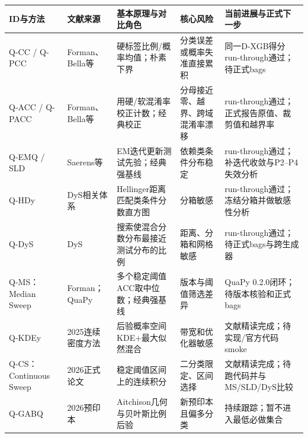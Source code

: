 \documentclass[
  chinese,
  12pt,
  a4paper,
  chinese,
  UTF8]{ctexart}
\begin{document}
\begin{longtable}[]{@{}
  >{\raggedright\arraybackslash}p{}
  >{\raggedright\arraybackslash}p{}
  >{\raggedright\arraybackslash}p{}
  >{\raggedright\arraybackslash}p{}
  >{\raggedright\arraybackslash}p{}@{}}
\toprule\noalign{}
\begin{minipage}[b]{\linewidth}\raggedright
ID与方法
\end{minipage} & \begin{minipage}[b]{\linewidth}\raggedright
文献来源
\end{minipage} & \begin{minipage}[b]{\linewidth}\raggedright
基本原理与对比角色
\end{minipage} & \begin{minipage}[b]{\linewidth}\raggedright
核心风险
\end{minipage} & \begin{minipage}[b]{\linewidth}\raggedright
当前进展与正式下一步
\end{minipage} \\
\midrule\noalign{}
\endhead
\bottomrule\noalign{}
\endlastfoot
Q-CC / Q-PCC &
Forman、Bella等\autocite{forman2008quantification,bella2010quantification}
& 硬标签比例/概率均值；朴素下界 & 分类误差或概率失准直接累积 &
同一D-XGB得分run-through通过；待正式bags \\
Q-ACC / Q-PACC &
Forman、Bella等\autocite{forman2008quantification,bella2010quantification}
& 用硬/软混淆率校正计数；经典校正 & 分母接近零、越界、跨域混淆率漂移 &
run-through通过；正式报告原值、裁剪值和越界率 \\
Q-EMQ / SLD & Saerens等\autocite{saerens2002emq} &
EM迭代更新测试先验；经典强基线 & 依赖类条件分布稳定 &
run-through通过；补迭代收敛与P2--P4失效分析 \\
Q-HDy & DyS相关体系\autocite{maletzke2019dys} &
Hellinger距离匹配类条件分数直方图 & 分箱敏感 &
run-through通过；冻结分箱并做敏感性分析 \\
Q-DyS & DyS\autocite{maletzke2019dys} &
搜索使混合分数分布最接近测试分布的比例 & 距离、分箱和网格敏感 &
run-through通过；待正式bags与跨生成器 \\
Q-MS：Median Sweep &
Forman；QuaPy\autocite{forman2008quantification,moreo2021quapy} &
多个稳定阈值ACC取中位数；经典强基线 & 版本与阈值筛选差异 & QuaPy
0.2.0闭环；待版本核验和正式bags \\
Q-KDEy & 2025连续密度方法\autocite{moreo2025kdey} &
后验概率空间KDE+最大似然混合 & 带宽和优化器敏感 &
文献精读完成；待实现/官方代码smoke \\
Q-CS：Continuous Sweep & 2026正式论文\autocite{kloos2026continuous} &
稳定阈值区间上的连续积分 & 二分类限定、区间选择 &
文献精读完成；待跑代码并与MS/SLD/DyS比较 \\
Q-GABQ & 2026预印本\autocite{moreo2026geometry} &
Aitchison几何与贝叶斯比例后验 & 新预印本且偏多分类 &
持续跟踪；暂不进入最低必做集合 \\
\end{longtable}
\end{document}
